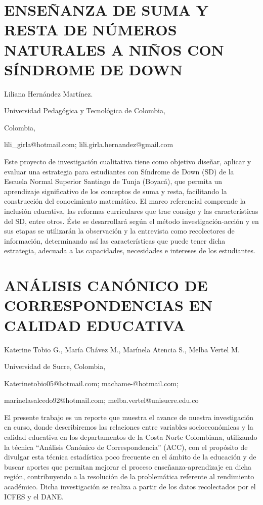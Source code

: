 \section{ENSEÑANZA DE SUMA Y RESTA DE NÚMEROS NATURALES A NIÑOS CON SÍNDROME
DE DOWN}

\begin{datos}

Liliana Hernández Martínez.

Universidad Pedagógica y Tecnológica de Colombia,

Colombia,

lili\_girla@hotmail.com; lili.girla.hernandez@gmail.com 

\end{datos}

Este proyecto de investigación cualitativa tiene como objetivo diseñar,
aplicar y evaluar una estrategia para estudiantes con Síndrome de
Down (SD) de la Escuela Normal Superior Santiago de Tunja (Boyacá),
que permita un aprendizaje significativo de los conceptos de suma
y resta, facilitando la construcción del conocimiento matemático.
El marco referencial comprende la inclusión educativa, las reformas
curriculares que trae consigo y las características del SD, entre
otros. Éste se desarrollará según el método investigación-acción y
en sus etapas se utilizarán la observación y la entrevista como recolectores
de información, determinando así las características que puede tener
dicha estrategia, adecuada a las capacidades, necesidades e intereses
de los estudiantes. 


\section{ANÁLISIS CANÓNICO DE CORRESPONDENCIAS EN CALIDAD EDUCATIVA}

\begin{datos}

Katerine Tobio G., María Chávez M., Marínela Atencia S., Melba Vertel
M.

Universidad de Sucre, Colombia,

Katerinetobio05@hotmail.com; machame-@hotmail.com;

marinelasalcedo92@hotmail.com; melba.vertel@unisucre.edu.co

\end{datos}

El presente trabajo es un reporte que muestra el avance de nuestra
investigación en curso, donde describiremos las relaciones entre variables
socioeconómicas y la calidad educativa en los departamentos de la
Costa Norte Colombiana, utilizando la técnica “Análisis Canónico de
Correspondencia” (ACC), con el propósito de divulgar esta técnica
estadística poco frecuente en el ámbito de la educación y de buscar
aportes que permitan mejorar el proceso enseñanza-aprendizaje en dicha
región, contribuyendo a la resolución de la problemática referente
al rendimiento académico. Dicha investigación se realiza a partir
de los datos recolectados por el ICFES y el DANE. 


